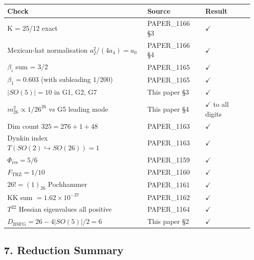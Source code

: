 \documentclass[
]{article}
\newcounter{none} %
\begin{document}
{\def\LTcaptype{none} %
\begin{longtable}[]{@{}
  >{\raggedright\arraybackslash}p{}
  >{\raggedright\arraybackslash}p{}
  >{\raggedright\arraybackslash}p{}@{}}
\toprule\noalign{}
\begin{minipage}[b]{\linewidth}\raggedright
Check
\end{minipage} & \begin{minipage}[b]{\linewidth}\raggedright
Source
\end{minipage} & \begin{minipage}[b]{\linewidth}\raggedright
Result
\end{minipage} \\
\midrule\noalign{}
\endhead
\bottomrule\noalign{}
\endlastfoot
K = 25/12 exact & PAPER\_1166 §3 & \(\checkmark\) \\
Mexican-hat normalisation \(a_2^2/(4a_4)=a_0\) & PAPER\_1166 §4 &
\(\checkmark\) \\
\(\beta_i\) sum = 3/2 & PAPER\_1165 & \(\checkmark\) \\
\(\beta_1 = 0.603\) (with subleading 1/200) & PAPER\_1165 &
\(\checkmark\) \\
\(|SO(5)|=10\) in G1, G2, G7 & This paper §3 & \(\checkmark\) \\
\(m_{26}^2 \propto 1/26^{26}\) vs G5 leading mode & This paper §4 &
\(\checkmark\) to all digits \\
Dim count \(325 = 276 + 1 + 48\) & PAPER\_1163 & \(\checkmark\) \\
Dynkin index \(T(SO(2)\hookrightarrow SO(26)) = 1\) & PAPER\_1163 &
\(\checkmark\) \\
\(\Phi_{\mathrm{res}} = 5/6\) & PAPER\_1159 & \(\checkmark\) \\
\(F_{\mathrm{TRZ}} = 1/10\) & PAPER\_1160 & \(\checkmark\) \\
\(26! = (1)_{26}\) Pochhammer & PAPER\_1161 & \(\checkmark\) \\
KK sum \(= 1.62\times 10^{-37}\) & PAPER\_1162 & \(\checkmark\) \\
\(T^{22}\) Hessian eigenvalues all positive & PAPER\_1164 &
\(\checkmark\) \\
\(D_{\mathrm{BSFG}} = 26 - 4|SO(5)|/2 = 6\) & This paper §2 &
\(\checkmark\) \\
\end{longtable}
}

\subsection{7. Reduction Summary}\label{reduction-summary}
\end{document}
